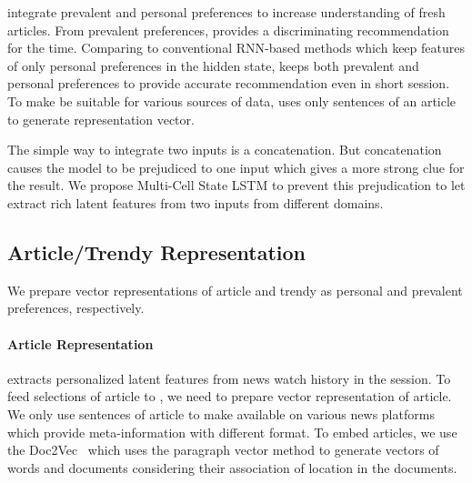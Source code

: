 \method integrate prevalent and personal preferences to increase understanding of fresh articles.
From prevalent preferences, \method provides a discriminating recommendation for the time.
Comparing to conventional RNN-based methods which keep features of only personal preferences in the hidden state, \method keeps both prevalent and personal preferences to provide accurate recommendation even in short session.
To make \method be suitable for various sources of data, \method uses only sentences of an article to generate representation vector.

The simple way to integrate two inputs is a concatenation.
But concatenation causes the model to be prejudiced to one input which gives a more strong clue for the result.
We propose Multi-Cell State LSTM to prevent this prejudication to let \method extract rich latent features from two inputs from different domains.


\subsection{Article/Trendy Representation}
\label{sec:method:repre}
We prepare vector representations of article and trendy as personal and prevalent preferences, respectively.
\paragraph{\textbf{Article Representation}}
\method extracts personalized latent features from news watch history in the session.
To feed selections of article to \methodname, we need to prepare vector representation of article.
We only use sentences of article to make \method available on various news platforms which provide meta-information with different format.
To embed articles, we use the Doc2Vec~\cite{Doc2Vec} which uses the paragraph vector method to generate vectors of words and documents considering their association of location in the documents.
